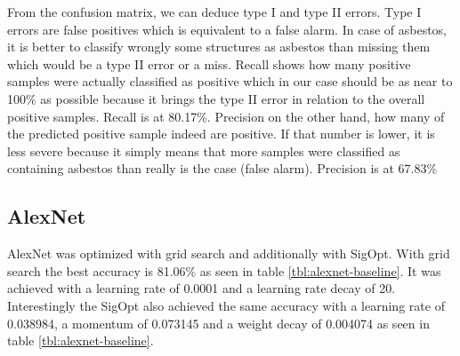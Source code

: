 From the confusion matrix, we can deduce type I and type II errors. Type I errors are false positives which is equivalent to a false alarm. In case of asbestos, it is better to classify wrongly some structures as asbestos than missing them which would be a type II error or a miss. Recall shows how many positive samples were actually classified as positive which in our case should be as near to 100\% as possible because it brings the type II error in relation to the overall positive samples. Recall is at 80.17\%. Precision on the other hand, how many of the predicted positive sample indeed are positive. If that number is lower, it is less severe because it simply means that more samples were classified as containing asbestos than really is the case (false alarm). Precision is at 67.83\%














\subsection{AlexNet}

AlexNet was optimized with grid search and additionally with SigOpt. With grid search the best accuracy is 81.06\% as seen in table \ref{tbl:alexnet-baseline}. It was achieved with a learning rate of 0.0001 and a learning rate decay of 20. Interestingly the SigOpt also achieved the same accuracy with a learning rate of 0.038984, a momentum of 0.073145 and a weight decay of 0.004074 as seen in table \ref{tbl:alexnet-baseline}.


